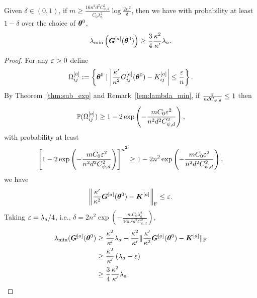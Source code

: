 \documentclass{article}
\begin{document}
\begin{lem}\label{lem:exp_a}
    Given $\delta\in(0,1)$, if $m\geq\frac{16n^2d^2C_{\psi,d}^2}{C_0\lambda_a^2}\log\frac{2n^2}{\delta}$, then we have with probability at least $1-\delta$ over the choice of $\bm{\theta}^0$,
    \begin{equation}
        \lambda_{\min}\left(\bm{G}^{[a]}(\bm{\theta}^0)\right)\geq\frac{3}{4}\frac{\kappa^2}{\kappa'}\lambda_a.
    \end{equation}
\end{lem}
\begin{proof}
    For any $\varepsilon>0$ define
    \begin{equation}
        \Omega_{ij}^{[a]}:=\left\{\bm{\theta}^0\mid\left|\frac{\kappa'}{\kappa^2}G_{ij}^{[a]}(\bm{\theta}^0)-K_{ij}^{[a]}\right|\leq\frac{\varepsilon}{n}\right\}.
    \end{equation}
    By Theorem~\ref{thm:sub_exp} and Remark~\ref{lem:lambda_min}, if $\frac{\varepsilon}{ndC_{\psi,d}}\leq 1$ then
    \begin{equation}
        \mathbb{P}(\Omega_{ij}^{[a]}) \geq 1-2\exp\left(-\frac{mC_0\varepsilon^2}{n^2d^2C^2_{\psi,d}}\right),
    \end{equation}
    with probability at least
    \begin{equation}
        \left[1-2\exp\left(-\frac{mC_0\varepsilon^2}{n^2 d^2 C^2_{\psi,d}}\right)\right]^{n^2}\geq 1-2n^2\exp\left(-\frac{mC_0\varepsilon^2}{n^2 d^2 C^2_{\psi,d}}\right),
    \end{equation}
    we have
    \begin{equation}
        \left\lVert\frac{\kappa'}{\kappa^2}\bm{G}^{[a]}(\bm{\theta}^0)-\bm{K}^{[a]}\right\rVert_\mathrm{F}\leq\varepsilon.
    \end{equation}
    Taking $\varepsilon=\lambda_a/4$, i.e., $\delta=2n^2\exp\left(-\frac{mC_0\lambda_a^2}{16n^2d^2C^2_{\psi,d}}\right)$,
    \begin{equation}
        \begin{aligned}
            \lambda_{\min}(\bm{G}^{[a]}(\bm{\theta}^0)
             & \geq \frac{\kappa^2}{\kappa'}\lambda_a-\frac{\kappa^2}{\kappa'}\lVert\frac{\kappa'}{\kappa^2}\bm{G}^{[a]}(\bm{\theta}^0)-\bm{K}^{[a]}\rVert_\mathrm{F} \\
             & \geq \frac{\kappa^2}{\kappa'}\left(\lambda_a-\varepsilon\right)                                                                            \\
             & \geq\frac{3}{4}\frac{\kappa^2}{\kappa'}\lambda_a.
        \end{aligned}
    \end{equation}
\end{proof}
\end{document}
